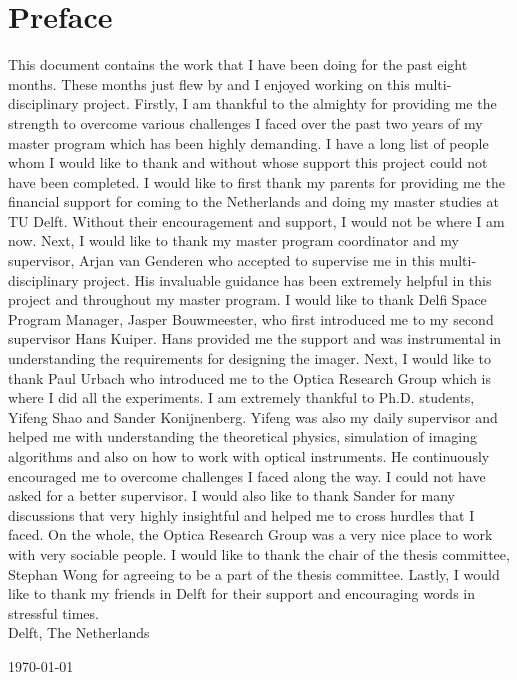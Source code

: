 \chapter*{Preface}
This document contains the work that I have been doing for the past eight months. These months just flew by and I enjoyed working on this multi-disciplinary project. Firstly, I am thankful to the almighty for providing me the strength to overcome various challenges I faced over the past two years of my master program which has been highly demanding. I have a long list of people whom I would like to thank and without whose support this project could not have been completed.
I would like to first thank my parents for providing me the financial support for coming to the Netherlands and doing my master studies at TU Delft. Without their encouragement and support, I would not be where I am now. Next, I would like to thank my master program coordinator and my supervisor, Arjan van Genderen who accepted to supervise me in this multi-disciplinary project. His invaluable guidance has been extremely helpful in this project and throughout my master program. 
I would like to thank Delfi Space Program Manager, Jasper Bouwmeester, who first introduced me to my second supervisor Hans Kuiper. Hans provided me the support and was instrumental in understanding the requirements for designing the imager. Next, I would like to thank Paul Urbach who introduced me to the Optica Research Group which is where I did all the experiments. I am extremely thankful to Ph.D. students, Yifeng Shao and Sander Konijnenberg. Yifeng was also my daily supervisor and helped me with understanding the theoretical physics, simulation of imaging algorithms and also on how to work with optical instruments. He continuously encouraged me to overcome challenges I faced along the way. I could not have asked for a better supervisor. I would also like to thank Sander for many discussions that very highly insightful and helped me to cross hurdles that I faced. On the whole, the Optica Research Group was a very nice place to work with very sociable people. I would like to thank the chair of the thesis committee, Stephan Wong for agreeing to be a part of the thesis committee. Lastly, I would like to thank my friends in Delft for their support and encouraging words in stressful times. \\


\noindent
Delft, The Netherlands

\noindent
\today
